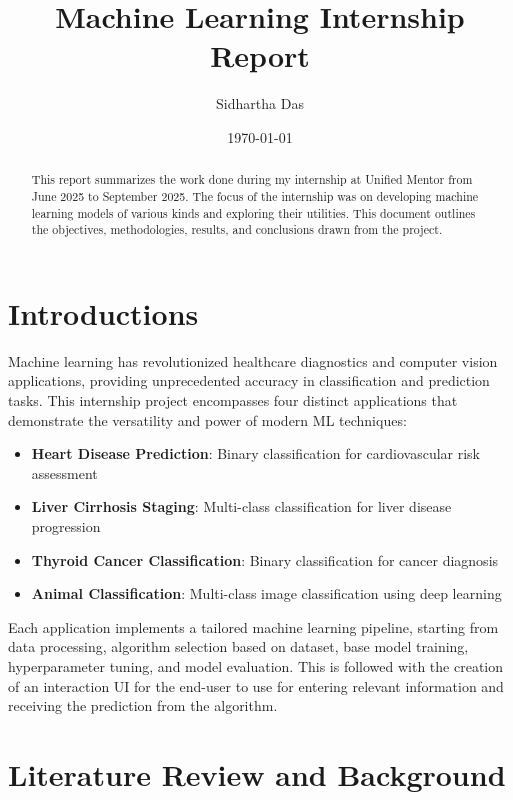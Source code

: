\documentclass[12pt, a4paper]{article}
\title{\textbf{Machine Learning Internship Report}}
\author{Sidhartha Das}
\date{\today}
\begin{document}
\maketitle

\begin{abstract}
    This report summarizes the work done during my internship at Unified Mentor from June 2025 to September 2025. The focus of the internship was on developing machine learning models of various kinds and exploring their utilities. This document outlines the objectives, methodologies, results, and conclusions drawn from the project.
\end{abstract}

\newpage
\tableofcontents
\newpage

\section{Introductions}


Machine learning has revolutionized healthcare diagnostics and computer vision applications, providing unprecedented accuracy in classification and prediction tasks. This internship project encompasses four distinct applications that demonstrate the versatility and power of modern ML techniques:

\begin{itemize}
    \item \textbf{Heart Disease Prediction}: Binary classification for cardiovascular risk assessment
    \item \textbf{Liver Cirrhosis Staging}: Multi-class classification for liver disease progression
    \item \textbf{Thyroid Cancer Classification}: Binary classification for cancer diagnosis
    \item \textbf{Animal Classification}: Multi-class image classification using deep learning
\end{itemize}

Each application implements a tailored machine learning pipeline, starting from data processing, algorithm selection based on dataset, base model training, hyperparameter tuning, and model evaluation. This is followed with the creation of an interaction UI for the end-user to use for entering relevant information and receiving the prediction from the algorithm.

\section{Literature Review and Background}
\end{document}
